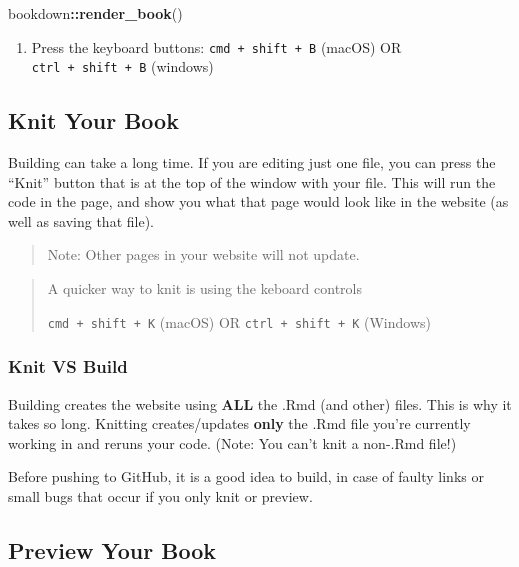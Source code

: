 \documentclass[
]{book}
\newenvironment{Shaded}{\begin{snugshade}}{\end{snugshade}}
\newcommand{\FunctionTok}[1]{\textcolor[rgb]{0.13,0.29,0.53}{\textbf{#1}}}
\newcommand{\NormalTok}[1]{#1}
\newcommand{\SpecialCharTok}[1]{\textcolor[rgb]{0.81,0.36,0.00}{\textbf{#1}}}
\providecommand{\tightlist}{%
  \setlength{\itemsep}{0pt}\setlength{\parskip}{0pt}}
\theoremstyle{definition}
\theoremstyle{definition}
\theoremstyle{definition}
\theoremstyle{definition}
\theoremstyle{remark}
\begin{document}
\begin{Shaded}
\begin{Highlighting}[]
\NormalTok{bookdown}\SpecialCharTok{::}\FunctionTok{render\_book}\NormalTok{()}
\end{Highlighting}
\end{Shaded}

\begin{enumerate}
\def\labelenumi{\arabic{enumi}.}
\setcounter{enumi}{1}
\tightlist
\item
  Press the keyboard buttons: \texttt{cmd\ +\ shift\ +\ B} (macOS) OR \texttt{ctrl\ +\ shift\ +\ B} (windows)
\end{enumerate}

\subsection{Knit Your Book}\label{knit-your-book}

Building can take a long time. If you are editing just one file, you can press the ``Knit'' button that is at the top of the window with your file. This will run the code in the page, and show you what that page would look like in the website (as well as saving that file).

\begin{quote}
Note: Other pages in your website will not update.
\end{quote}

\begin{quote}
A quicker way to knit is using the keboard controls

\texttt{cmd\ +\ shift\ +\ K} (macOS) OR \texttt{ctrl\ +\ shift\ +\ K} (Windows)
\end{quote}

\subsubsection{Knit VS Build}\label{knit-vs-build}

Building creates the website using \textbf{ALL} the .Rmd (and other) files. This is why it takes so long. Knitting creates/updates \textbf{only} the .Rmd file you're currently working in and reruns your code. (Note: You can't knit a non-.Rmd file!)

Before pushing to GitHub, it is a good idea to build, in case of faulty links or small bugs that occur if you only knit or preview.

\subsection{Preview Your Book}\label{preview-your-book}
\end{document}
